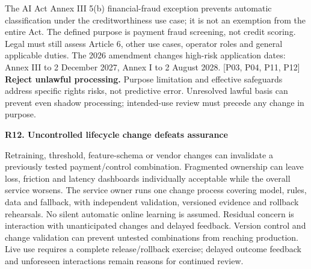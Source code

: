 \documentclass[11pt,a4paper]{article}
\newcommand{\sub}[1]{\par\vspace{2mm}\textbf{\color{ink}#1}\par}
\newcommand{\src}[1]{{\small[#1]}}
\newcommand{\risk}[2]{\sub{#1. #2}}
\begin{document}
The AI Act Annex III 5(b) financial-fraud exception prevents automatic classification under the creditworthiness use case; it is not an exemption from the entire Act. The defined purpose is payment fraud screening, not credit scoring. Legal must still assess Article 6, other use cases, operator roles and general applicable duties. The 2026 amendment changes high-risk application dates: Annex III to 2 December 2027, Annex I to 2 August 2028. \src{P03, P04, P11, P12} \textbf{Reject unlawful processing.} Purpose limitation and effective safeguards address specific rights risks, not predictive error. Unresolved lawful basis can prevent even shadow processing; intended-use review must precede any change in purpose.
\risk{R12}{Uncontrolled lifecycle change defeats assurance}
Retraining, threshold, feature-schema or vendor changes can invalidate a previously tested payment/control combination. Fragmented ownership can leave loss, friction and latency dashboards individually acceptable while the overall service worsens. The service owner runs one change process covering model, rules, data and fallback, with independent validation, versioned evidence and rollback rehearsals. No silent automatic online learning is assumed. Residual concern is interaction with unanticipated changes and delayed feedback. Version control and change validation can prevent untested combinations from reaching production. Live use requires a complete release/rollback exercise; delayed outcome feedback and unforeseen interactions remain reasons for continued review.
\end{document}

